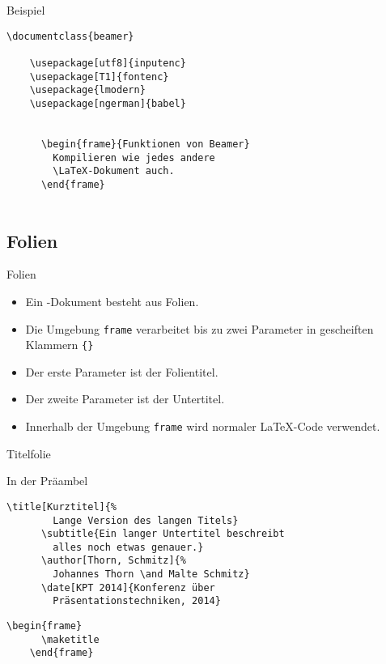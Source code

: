 
\begin{Frame}[fragile]{Beispiel}
  \begin{lstlisting}[gobble=4]
    \documentclass{beamer}

    \usepackage[utf8]{inputenc}
    \usepackage[T1]{fontenc}
    \usepackage{lmodern}
    \usepackage[ngerman]{babel}

    
      \begin{frame}{Funktionen von Beamer}
        Kompilieren wie jedes andere
        \LaTeX-Dokument auch.
      \end{frame}
    
  \end{lstlisting}
\end{Frame}


\subsection{Folien}

\begin{Frame}[fragile]{Folien}
  \begin{itemize}
    \item Ein \beamer-Dokument besteht aus Folien.
    \item Die Umgebung \lstinline-frame- verarbeitet
      bis zu zwei Parameter in gescheiften Klammern \lstinline-{}-
    \item Der erste Parameter ist der Folientitel.
    \item Der zweite Parameter ist der Untertitel.
    \item Innerhalb der Umgebung \lstinline|frame| wird normaler \LaTeX-Code
      verwendet.
  \end{itemize}
\end{Frame}

\begin{Frame}[fragile]{Titelfolie}
  \begin{Block}{In der Präambel}
    \begin{lstlisting}[gobble=6,style=block]
      \title[Kurztitel]{%
        Lange Version des langen Titels}
      \subtitle{Ein langer Untertitel beschreibt
        alles noch etwas genauer.}
      \author[Thorn, Schmitz]{%
        Johannes Thorn \and Malte Schmitz}
      \date[KPT 2014]{Konferenz über
        Präsentationstechniken, 2014}
    \end{lstlisting}
  \end{Block}

  \begin{lstlisting}[gobble=4]
    \begin{frame}
      \maketitle
    \end{frame}
  \end{lstlisting}
\end{Frame}

